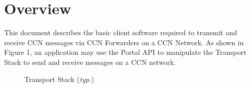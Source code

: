 

\flushbottom %

\maketitle %

\tableofcontents %

\thispagestyle{empty} %


\section{Overview} %
This document describes the basic client software required to transmit and receive CCN messages
via CCN Forwarders on a CCN Network. As shown in Figure 1, an application may use the Portal API to manipulate 
the Transport Stack to send and receive messages on a CCN network.

 \begin{figure}[ht]
\caption{Transport Stack ({\it typ.\/})}
\end{figure}


